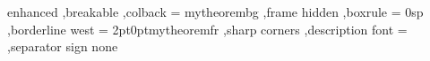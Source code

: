 
\setlength{\parindent}{1cm}




{%
	enhanced
	,breakable
	,colback = mytheorembg
	,frame hidden
	,boxrule = 0sp
	,borderline west = {2pt}{0pt}{mytheoremfr}
	,sharp corners
	,description font = \mdseries
	,separator sign none
}



